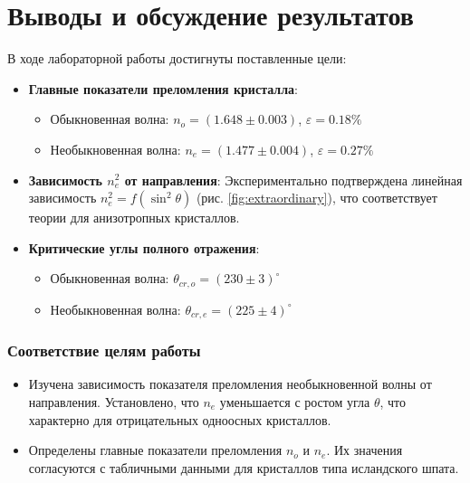 \section{Выводы и обсуждение результатов}

В ходе лабораторной работы достигнуты поставленные цели:  

\begin{itemize}
    \item \textbf{Главные показатели преломления кристалла}:  
    \begin{itemize}
        \item Обыкновенная волна: \( n_o = \left(1.648 \pm 0.003\right) \), \( \varepsilon = 0.18\% \)
        \item Необыкновенная волна: \( n_e = \left(1.477 \pm 0.004\right) \), \( \varepsilon = 0.27\% \)
    \end{itemize}
    
    \item \textbf{Зависимость \( n_e^2 \) от направления}:  
    Экспериментально подтверждена линейная зависимость \( n_e^2 = f(\sin^2\theta) \) (рис. \ref{fig:extraordinary}), что соответствует теории для анизотропных кристаллов. 

    \item \textbf{Критические углы полного отражения}:  
    \begin{itemize}
        \item Обыкновенная волна: \( \theta_{cr,o} = \left(230 \pm 3\right)^\circ \)
        \item Необыкновенная волна: \( \theta_{cr,e} = \left(225 \pm 4\right)^\circ \)
    \end{itemize}
\end{itemize}

\subsubsection*{Соответствие целям работы}  
\begin{itemize}
    \item Изучена зависимость показателя преломления необыкновенной волны от направления. Установлено, что \( n_e \) уменьшается с ростом угла \( \theta \), что характерно для отрицательных одноосных кристаллов.
    \item Определены главные показатели преломления \( n_o \) и \( n_e \). Их значения согласуются с табличными данными для кристаллов типа исландского шпата.
\end{itemize}